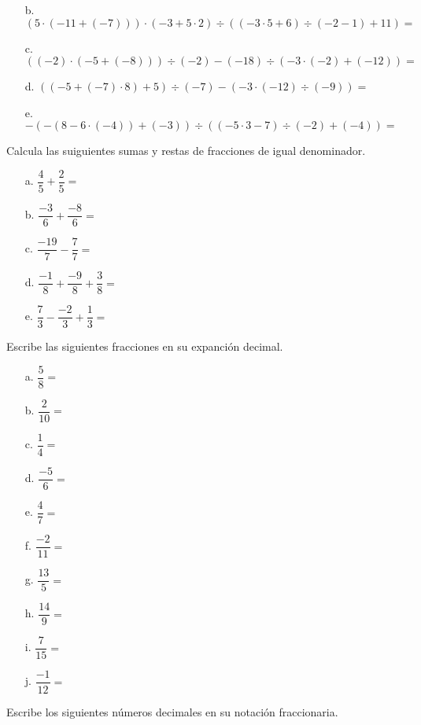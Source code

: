 \documentclass[spanish,letterpaper, 11pt, addpoints, answers]{exam}
\begin{document}
\begin{questions}
\begin{itemize}
  \item[b.] $(5\cdot (-11+(-7)))\cdot(-3+5\cdot 2)\div((-3\cdot 5+6)\div (-2-1)+11)=$
  
  \item[c.] $((-2)\cdot (-5+(-8)))\div (-2)-(-18)\div(-3\cdot (-2)+(-12))=$
  
  \item[d.] $((-5+(-7)\cdot 8)+5)\div (-7)-(-3\cdot (-12 )\div (-9))=$
  
  \item[e.] $-(-(8-6\cdot (-4))+(-3))\div ((-5\cdot 3-7)\div(-2)+(-4))=$
  
  \end{itemize}

\question Calcula las suiguientes sumas y restas de fracciones de igual denominador.

\begin{itemize}
  \item[a.] $\dfrac{4}{5}+\dfrac{2}{5}=$
  \item[b.] $\dfrac{-3}{6}+\dfrac{-8}{6}=$
  \item[c.] $\dfrac{-19}{7}-\dfrac{7}{7}=$
  \item[d.] $\dfrac{-1}{8}+\dfrac{-9}{8}+\dfrac{3}{8}=$
  \item[e.] $\dfrac{7}{3}-\dfrac{-2}{3}+\dfrac{1}{3}=$  
\end{itemize}
\newpage
\question Escribe las siguientes fracciones en su expanción decimal.

\begin{multicols}{2}
\begin{itemize}
  \item[a.] $\dfrac{5}{8}=$
  \item[b.] $\dfrac{2}{10}=$
  \item[c.] $\dfrac{1}{4}=$
  \item[d.] $\dfrac{-5}{6}=$
  \item[e.] $\dfrac{4}{7}=$
  \item[f.] $\dfrac{-2}{11}=$
  \item[g.] $\dfrac{13}{5}=$
  \item[h.] $\dfrac{14}{9}=$
  \item[i.] $\dfrac{7}{15}=$
  \item[j.] $\dfrac{-1}{12}=$  
\end{itemize}
\end{multicols}

\question Escribe los siguientes números decimales en su notación fraccionaria.


\end{questions}
\end{document}
